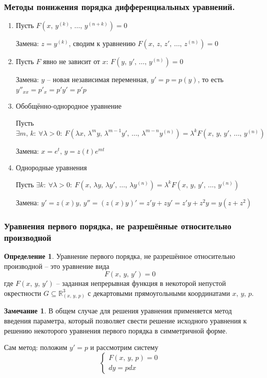 \documentclass[a4paper,12pt]{article}
\theoremstyle{plain}
\theoremstyle{definition}
\newtheorem{definition}{Определение}[section]
\newtheorem*{note}{Замечание}
\theoremstyle{remark}
\begin{document}
\subsubsection*{Методы понижения порядка дифференциальных уравнений.}
\begin{enumerate}
	\item Пусть $F(x,\, y^{(k)},\,\ldots,\,y^{(n + k)}) = 0$

	      Замена: $z = y^{(k)}$, сводим к уравнению $F(x,\, z,\, z',\,\ldots,\,z^{(n)}) = 0$
	\item Пусть $F$ явно не зависит от $x$: $F(y,\, y',\,\ldots,\,y^{(n)}) = 0$

	      Замена: $y$ -- новая независимая переменная, $y' = p = p(y)$, то есть $y''_{xx} = p'_x = p'y'=p'p$
	\item Обобщённо-однородное уравнение

	      Пусть $\exists m,\,k:\: \forall \lambda > 0:\: F(\lambda x,\, \lambda^m y,\, \lambda^{m - 1}y',\,\ldots,\,\lambda^{m - n}y^{(n)}) = \lambda^k F(x,\,y,\,y',\,\ldots,\,y^{(n)})$

	      Замена: $x = e^t,\, y = z(t)e^{mt}$
	\item Однородные уравнения

	      Пусть $\exists k:\: \forall \lambda > 0:\: F(x,\, \lambda y,\, \lambda y',\,\ldots,\, \lambda y^{(n)}) = \lambda^k F(x,\,y,\,y',\,\ldots,\,y^{(n)})$

	      Замена: $y' = z(x)y,\, y'' = (z(x)y)' = z'y + zy' = z'y + z^2y = y(z + z^2)$
\end{enumerate}

\subsubsection*{Уравнения первого порядка, не разрешённые относительно производной}
\begin{definition}
	Уравнение первого порядка, не разрешённое относительно производной -- это уравнение вида
	\[F(x,\,y,\,y') = 0\]
	где $F(x,\,y,\,y')$ -- заданная непрерывная функция в некоторой непустой окрестности $G \subseteq \mathbb{R}^3_{(x,\,y,\,p)}$ с декартовыми прямоугольными координатами $x,\,y,\,p$.
\end{definition}

\begin{note}
	В общем случае для решения уравнения применяется метод введения параметра, который позволяет свести решение исходного уравнения к решению некоторого уравнения первого порядка в симметричной форме.

	Сам метод: положим $y' = p$ и рассмотрим систему
	\begin{equation}
		\label{BASE}
		\begin{cases}
			F(x,\,y,\,p) = 0 \\
			dy = pdx
		\end{cases}
	\end{equation}
\end{note}
\end{document}
